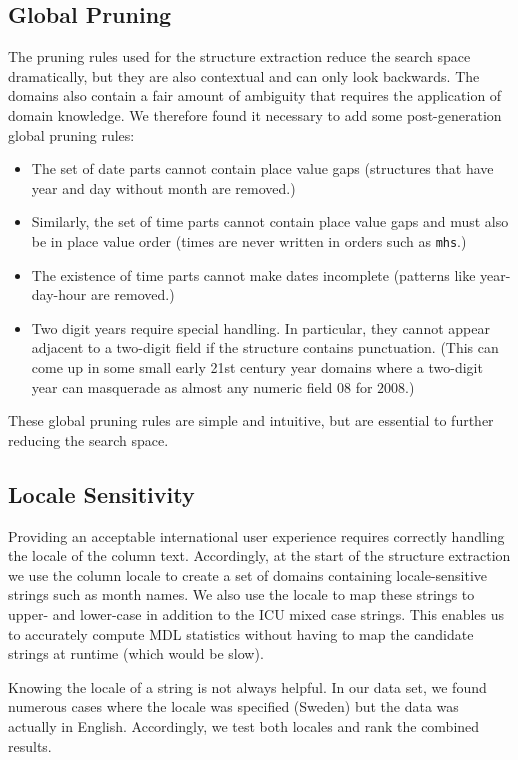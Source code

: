 \subsection{Global Pruning}
The pruning rules used for the structure extraction reduce the search space dramatically, but they are also contextual and can only look backwards. The domains also contain a fair amount of ambiguity that requires the application of domain knowledge. We therefore found it necessary to add some post-generation global pruning rules:
\begin{itemize}
\item The set of date parts cannot contain place value gaps (\eg structures that have year and day without month are removed.)
\item Similarly, the set of time parts cannot contain place value gaps and must also be in place value order (times are never written in orders such as \texttt{mhs}.)
\item The existence of time parts cannot make dates incomplete (\eg patterns like year-day-hour are removed.)
\item Two digit years require special handling. In particular, they cannot appear adjacent to a two-digit field if the structure contains punctuation. (This can come up in some small early 21st century year domains where a two-digit year can masquerade as almost any numeric field \eg $08$ for $2008$.)
\end{itemize}

These global pruning rules are simple and intuitive, but are essential to further reducing the search space.

\subsection{Locale Sensitivity}
Providing an acceptable international user experience requires correctly handling the locale of the column text. Accordingly, at the start of the structure extraction we use the column locale to create a set of domains containing locale-sensitive strings such as month names. We also use the locale to map these strings to upper- and lower-case in addition to the ICU mixed case strings. This enables us to accurately compute MDL statistics without having to map the candidate strings at runtime (which would be slow).

Knowing the locale of a string is not always helpful. In our data set, we found numerous cases where the locale was specified (\eg Sweden) but the data was actually in English. Accordingly, we test both locales and rank the combined results. 

